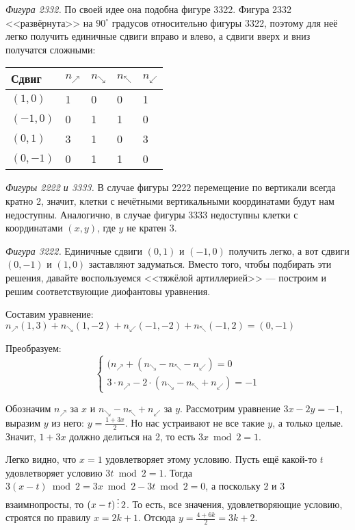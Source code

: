 \begin{itemize}
\emph{Фигура 2332.} По своей идее она подобна фигуре 3322. Фигура 2332 <<развёрнута>> на $90^\circ$ 
градусов относительно фигуры 3322, поэтому для неё легко получить единичные сдвиги вправо и влево, а сдвиги 
вверх и вниз получатся сложными:

\begin{center}\begin{tabular}{lllll}
Сдвиг & $n_\nearrow$ & $n_\searrow$ & $n_\nwarrow$ & $n_\swarrow$ \\
\hline
$(1,0)$ & 1 & 0 & 0 & 1\\
$(-1,0)$ & 0 & 1 & 1 & 0\\
$(0,1)$ & 3 & 1 & 0 & 3\\
$(0,-1)$ & 0 & 1 & 1 & 0
\end{tabular}\end{center}

\emph{Фигуры 2222 и 3333.} В случае фигуры 2222 перемещение по вертикали всегда кратно 2, значит, клетки с 
нечётными вертикальными координатами будут нам недоступны. Аналогично, в случае фигуры 3333 недоступны
клетки с координатами $(x,y)$, где $y$ не кратен 3.

\emph{Фигура 3222.} Единичные сдвиги $(0,1)$ и $(-1,0)$ получить легко, а вот сдвиги $(0,-1)$ и $(1,0)$ заставляют 
задуматься. Вместо того, чтобы подбирать эти решения, давайте воспользуемся <<тяжёлой артиллерией>> ---
построим и решим соответствующие диофантовы уравнения.

Составим уравнение:
$n_\nearrow(1,3) + n_\searrow(1,-2) + n_\swarrow(-1,-2) + n_\nwarrow(-1,2) = (0,-1)$

Преобразуем:
$$\left\{\begin{array}{l}
  (n_\nearrow + (n_\searrow - n_\nwarrow - n_\swarrow) = 0\\
  3\cdot n_\nearrow - 2\cdot(n_\searrow - n_\nwarrow + n_\swarrow)=-1
\end{array}\right.$$

Обозначим $n_\nearrow$ за $x$ и $n_\searrow - n_\nwarrow + n_\swarrow$ за $y$.
Рассмотрим уравнение $3x - 2y = -1$, выразим $y$ из него: $y = \frac{1 + 3x}{2}$. 
Но нас устраивают не все такие $y$, а только целые. Значит, $1+3x$ должно делиться на 2, 
то есть $3x \bmod 2 = 1$. 

Легко видно, что $x=1$ удовлетворяет этому условию. Пусть ещё какой-то $t$ удовлетворяет
условию $3t \bmod 2 = 1$. Тогда $3(x-t) \bmod 2 = 3x \bmod 2 - 3t \bmod 2 = 0$,
а поскольку 2 и 3 взаимнопросты, то $(x-t) \mathop{\vdots} 2$.
То есть, все значения, удовлетворяющие условию, строятся по правилу $x = 2k + 1$.
Отсюда $y = \frac{4 + 6k}{2} = 3k + 2$.


\end{itemize}
